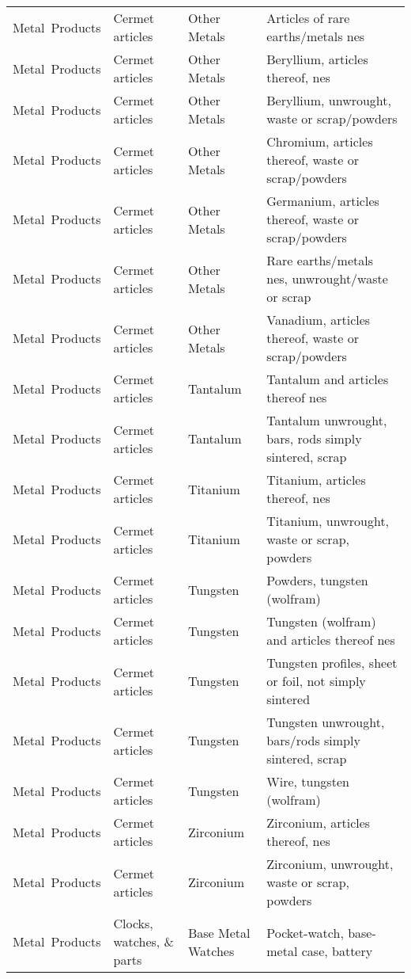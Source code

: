 \begin{appendices}
\begin{xltabular}{\textwidth}{|p{0.10\textwidth}|p{0.25\textwidth}|p{0.20\textwidth}|p{0.35\textwidth}|}
		Metal\ Products & Cermet articles & Other Metals & Articles of rare earths/metals nes \\
		Metal\ Products & Cermet articles & Other Metals & Beryllium, articles thereof, nes \\
		Metal\ Products & Cermet articles & Other Metals & Beryllium, unwrought, waste or scrap/powders \\
		Metal\ Products & Cermet articles & Other Metals & Chromium, articles thereof, waste or scrap/powders \\
		Metal\ Products & Cermet articles & Other Metals & Germanium, articles thereof, waste or scrap/powders \\
		Metal\ Products & Cermet articles & Other Metals & Rare earths/metals nes, unwrought/waste or scrap \\
		Metal\ Products & Cermet articles & Other Metals & Vanadium, articles thereof, waste or scrap/powders \\
		Metal\ Products & Cermet articles & Tantalum & Tantalum and articles thereof nes \\
		Metal\ Products & Cermet articles & Tantalum & Tantalum unwrought, bars, rods simply sintered, scrap \\
		Metal\ Products & Cermet articles & Titanium & Titanium, articles thereof, nes \\
		Metal\ Products & Cermet articles & Titanium & Titanium, unwrought, waste or scrap, powders \\
		Metal\ Products & Cermet articles & Tungsten & Powders, tungsten (wolfram) \\
		Metal\ Products & Cermet articles & Tungsten & Tungsten (wolfram) and articles thereof nes \\
		Metal\ Products & Cermet articles & Tungsten & Tungsten profiles, sheet or foil, not simply sintered \\
		Metal\ Products & Cermet articles & Tungsten & Tungsten unwrought, bars/rods simply sintered, scrap \\
		Metal\ Products & Cermet articles & Tungsten & Wire, tungsten (wolfram) \\
		Metal\ Products & Cermet articles & Zirconium & Zirconium, articles thereof, nes \\
		Metal\ Products & Cermet articles & Zirconium & Zirconium, unwrought, waste or scrap, powders \\
		Metal\ Products & Clocks, watches, \& parts & Base Metal Watches & Pocket-watch, base-metal case, battery \\

\end{xltabular}
\end{appendices}
